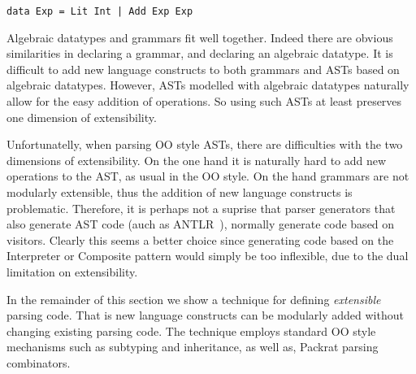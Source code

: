 \begin{lstlisting} 
data Exp = Lit Int | Add Exp Exp
\end{lstlisting}

Algebraic datatypes and grammars fit well together. Indeed there are
obvious similarities in declaring a grammar, and declaring an
algebraic datatype. It is difficult to add new language
constructs to both grammars and ASTs based on algebraic datatypes. However,
ASTs modelled with algebraic datatypes naturally allow for the easy
addition of operations. So using such ASTs at least preserves one
dimension of extensibility.

Unfortunatelly, when parsing OO style ASTs, there are difficulties with
the two dimensions of extensibility. On the one hand it is naturally hard to 
add new operations to the AST, as usual in the OO style. On the hand 
grammars are not modularly extensible, thus the addition of new
language constructs is problematic. Therefore,
it is perhaps not a suprise that parser generators that also generate 
AST code (auch as ANTLR~\cite{}), normally generate code based on 
visitors. Clearly this seems a better choice since generating code 
based on the {\sc Interpreter} or {\sc Composite} pattern would 
simply be too inflexible, due to the dual limitation on extensibility.

In the remainder of this section we show a technique for 
defining \emph{extensible} parsing code. That is new 
language constructs can be modularly added without changing 
existing parsing code. The technique employs standard OO 
style mechanisms such as subtyping and inheritance, as well as, 
Packrat parsing combinators.


